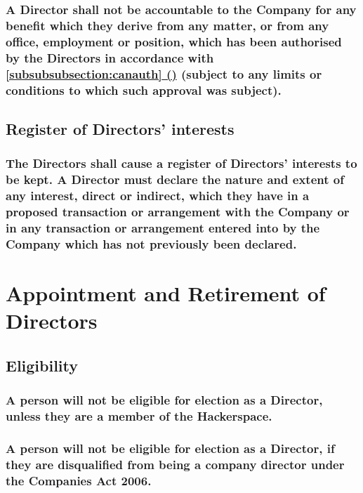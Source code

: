 \documentclass[12pt]{article}
\newcommand*{\fancyref}[1]{\hyperref[{#1}]{\autoref*{#1} (\nameref*{#1})}}
\begin{document}
\subsubsection[Directors' accountabilty and authorised Conflict of Interest]{A Director shall not be accountable to the Company for any benefit which they derive from any matter, or from any office, employment or position, which has been authorised by the Directors in accordance with \fancyref{subsubsubsection:canauth} (subject to any limits or conditions to which such approval was subject).}

\subsection{Register of Directors' interests}
\subsubsection[Specifics of register of Directors' interests]{The Directors shall cause a register of Directors' interests to be kept. A Director must declare the nature and extent of any interest, direct or indirect, which they have in a proposed transaction or arrangement with the Company or in any transaction or arrangement entered into by the Company which has not previously been declared.}

\section*{Appointment and Retirement of Directors}

\subsection{Eligibility}
\subsubsection[A Director must be a Member]{A person will not be eligible for election as a Director, unless they are a member of the Hackerspace.}
\subsubsection[Members' disqualification from standing as Director]{A person will not be eligible for election as a Director, if they are disqualified from being a company director under the Companies Act 2006.}\label{subsection:caDisqualified}
\end{document}
